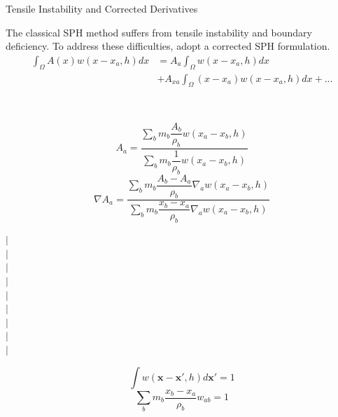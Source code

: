 \documentclass{beamer}
\begin{document}
\begin{frame}{Tensile Instability and Corrected Derivatives}
\begin{minipage}{0.99 \textwidth}
The classical SPH method suffers from tensile instability and boundary deficiency. To address these difficulties, adopt a corrected SPH formulation.
\begin{equation}
\begin{split}
\int_{\Omega} A\left(x\right) w\left(x- x_a, h\right) dx &= 
A_a \int_{\Omega} w\left(x - x_a, h\right) dx \\  & +A_{xa} \int_{\Omega} \left(x-x_a\right) w\left(x - x_a, h\right) dx +...
\end{split}
\end{equation}
\end{minipage}
\\
\noindent
\begin{minipage}{0.99 \textwidth}
\begin{minipage}{0.60 \textwidth}
\begin{equation}
A_a = \frac{\sum_b m_b \dfrac{A_b}{\rho_b} w\left(x_a-x_b, h\right)}{\sum_b m_b \dfrac{1}{\rho_b} w\left(x_a-x_b, h\right)}
\label{eq:CSP-function-approximation-1d}
\end{equation}
\begin{equation}
\nabla A_a = \frac{\sum_b m_b \dfrac{A_b - A_a}{\rho_b} \nabla_a w\left(x_a-x_b, h\right)}{\sum_b m_b \dfrac{x_b - x_a}{\rho_b} \nabla_a w\left(x_a-x_b, h\right)}
\end{equation}
\end{minipage}
\begin{minipage}{.01\textwidth}
$\vert$\\
$\vert$\\
$\vert$\\
$\vert$\\
$\vert$\\
$\vert$\\
$\vert$\\
$\vert$\\
$\vert$\\
\end{minipage}
\begin{minipage}{0.37 \textwidth}
\begin{equation}
\int	 w\left(\textbf{x}-\textbf{x}\prime, h\right) d\textbf{x}\prime = 1
\label{eq:SPH-kernel-normalization-prop}
\end{equation}
\begin{equation}
\sum_b m_b \dfrac{x_b - x_a}{\rho_b} w_{ab} = 1 
\label{eq:SPH-kernel-normalization-prop}
\end{equation}
\end{minipage}
%
\end{minipage}
%
\end{frame}
\end{document}
